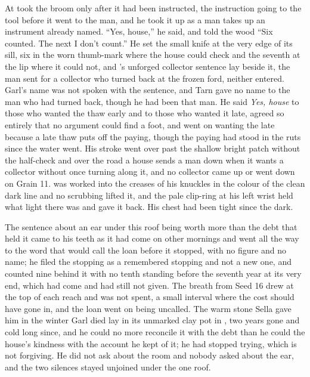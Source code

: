 \scenebreak

At   took the broom only after it had been instructed, the instruction going to the tool before it went to the man, and he took it up as a man takes up an instrument already named. “Yes, house,” he said, and told the wood “Six counted. The next I don't count.” He set the small knife at the very edge of its sill, six in the worn thumb-mark where the house could check and the seventh at the lip where it could not, and 's unforged collector sentence lay beside it, the man sent for a collector who turned back at the frozen ford, neither entered. Garl's name was not spoken with the sentence, and Tarn gave no name to the man who had turned back, though he had been that man. He said \emph{Yes, house} to those who wanted the thaw early and to those who wanted it late, agreed so entirely that no argument could find a foot, and went on wanting the late because a late thaw puts off the paying, though the paying had stood in the ruts since the water went. His stroke went over  past the shallow bright patch without the half-check and over the road a house sends a man down when it wants a collector without once turning along it, and no collector came up or went down  on Grain 11.  was worked into the creases of his knuckles in the colour of the clean dark line and no scrubbing lifted it, and the pale clip-ring at his left wrist held what light there was and gave it back. His chest had been tight since the dark.

The sentence about an ear under this roof being worth more than the debt that held it came to his teeth as it had come on other mornings and went all the way to the word that would call the loan before it stopped, with no figure and no name; he filed the stopping as a remembered stopping and not a new one, and counted nine behind it with no tenth standing before the seventh year at its very end, which had come and had still not given. The breath from Seed 16 drew at the top of each reach and was not spent, a small interval where the cost should have gone in, and the loan went on being uncalled. The warm stone Sella gave him in the winter Garl died lay in its unmarked clay pot in , two years gone and cold long since, and he could no more reconcile it with the debt than he could the house's kindness with the account he kept of it; he had stopped trying, which is not forgiving. He did not ask about the room and nobody asked about the ear, and the two silences stayed unjoined under the one roof.

